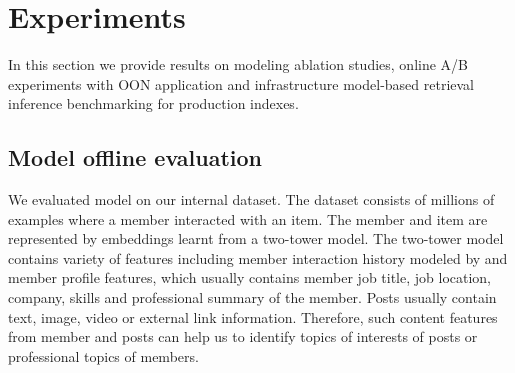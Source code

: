\section{Experiments}

In this section we provide results on modeling ablation studies, online A/B experiments with OON application and infrastructure model-based retrieval inference benchmarking for production indexes.

\subsection{Model offline evaluation}\label{sec:offline_evaluation}
We evaluated {\systemname} model on our internal dataset. The dataset consists of millions of examples where a member interacted with an item. The member and item are represented by embeddings learnt from a two-tower model.
The two-tower model contains variety of features including member interaction history modeled by \cite{nxtpost_paper} and member profile features, which usually contains member job title, job location, company, skills and professional summary of the member. Posts usually contain text, image, video or external link information. Therefore, such content features from member and posts can help us to identify topics of interests of posts or professional topics of members. 

